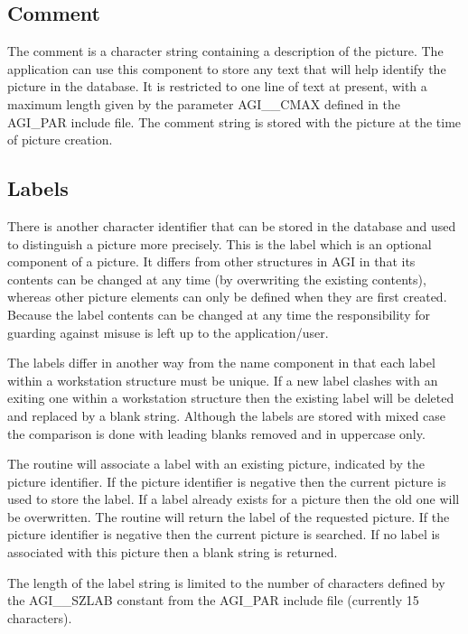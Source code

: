 \documentclass[twoside,11pt,nolof]{starlink}
\begin{document}
\subsection{Comment}
The comment is a character string containing a description of the
picture. The application can use this component to store any text that
will help identify the picture in the database.
It is restricted to one line of text at present, with a maximum length
given by the parameter AGI\_\_CMAX defined in the AGI\_PAR include file.
The comment string is stored with the picture at the time of picture creation.

\subsection{Labels}\label{lab}
There is another character identifier that can be stored in the database
and used to distinguish a picture more precisely. This is the label which
is an optional component of a picture.
It differs from other structures in AGI in that its contents can be
changed at any time (by overwriting the existing contents), whereas
other picture elements can only be defined when they are first created.
Because the label contents can be changed at any time the responsibility
for guarding against misuse is left up to the application/user.

The labels differ in another way from the name component in that each
label within a workstation structure must be unique. If a new label clashes
with an exiting one within a workstation structure then the existing label
will be deleted and replaced by a blank string. Although the labels are
stored with mixed case the comparison is done with leading blanks removed
and in uppercase only.

The routine 
will associate a label with an existing picture,
indicated by the picture identifier. If the picture identifier is negative
then the current picture is used to store the label. If a label already
exists for a picture then the old one will be overwritten.
The routine 
will return the label of the requested picture.
If the picture identifier is negative then the current picture is searched.
If no label is associated with this picture then a blank string is returned.

The length of the label string is limited to the number of characters defined
by the AGI\_\_SZLAB constant from the AGI\_PAR include file
(currently 15 characters).
\end{document}
